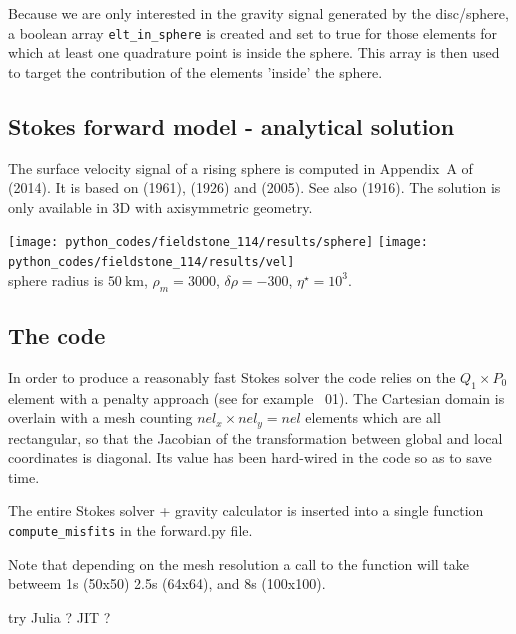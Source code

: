 Because we are only interested in the gravity signal generated by the disc/sphere, 
a boolean array {\tt elt\_in\_sphere} is created and set to true for those elements
for which at least one quadrature point is inside the sphere. This array is then used
to target the contribution of the elements 'inside' the sphere. 



\subsection*{Stokes forward model - analytical solution}

The surface velocity signal of a rising sphere is computed in Appendix~A of \textcite{bakp14} (2014).
It is based on \textcite{bren61} (1961), \cite{stje26} (1926) and \textcite{paso05} (2005). See also 
\textcite{burg16} (1916). The solution is only available in 3D with axisymmetric geometry. 

\begin{center}
\texttt{[image: python\_codes/fieldstone\_114/results/sphere]}
\texttt{[image: python\_codes/fieldstone\_114/results/vel]}\\
{\captionfont sphere radius is $50~\si{\km}$, $\rho_m=3000$, $\delta\rho=-300$, $\eta^\star=10^3$.}
\end{center}


\subsection*{The code}

In order to produce a reasonably fast Stokes solver the code relies on 
the $Q_1\times P_0$ element with a penalty approach (see for example \stone~01).
The Cartesian domain is overlain with a mesh counting $nel_x\times nel_y=nel$
elements which are all rectangular, so that the Jacobian of the transformation
between global and local coordinates is diagonal. Its value has been 
hard-wired in the code so as to save time. 

The entire Stokes solver + gravity calculator is inserted into a single function
{\tt compute\_misfits} in the {\pythonfile forward.py} file.

Note that depending on the mesh resolution a call to the function will take betweem 1s 
(50x50)
2.5s (64x64), 
 and 8s (100x100). 

try Julia ? JIT ?


